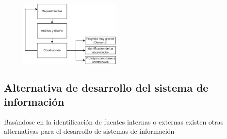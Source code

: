 \documentclass{templateNote}
\begin{document}
\begin{figure}[H]
    \centering
    \includegraphics[width=0.45\textwidth]{img/Prototipo.png}
\end{figure}
\subsection{Alternativa de desarrollo del sistema de información}
\noindent Basándose en la identificación de fuentes internas o externas existen otras alternativas para el desarrollo de sistemas de información
\end{document}
